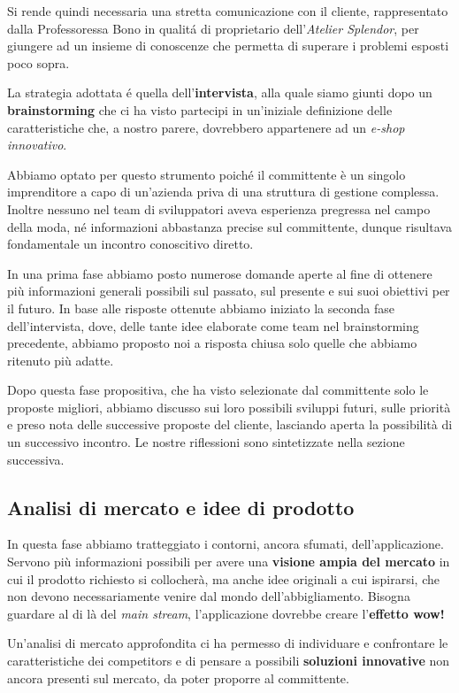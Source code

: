 \documentclass[12pt]{article}
\begin{document}
Si rende quindi necessaria una stretta comunicazione con il cliente, rappresentato dalla Professoressa Bono in qualit\'a di proprietario dell'{\em Atelier Splendor}, per giungere ad un insieme di conoscenze che permetta di superare i problemi esposti poco sopra.

La strategia adottata \'e quella dell'\textbf{intervista}, alla quale siamo giunti dopo un \textbf{brainstorming} che ci ha visto partecipi in un'iniziale definizione delle caratteristiche che, a nostro parere, dovrebbero appartenere ad un \textit{e-shop innovativo}.

Abbiamo optato per questo strumento poiché il committente è un singolo imprenditore a capo di un'azienda priva di una struttura di gestione complessa.
Inoltre nessuno nel team di sviluppatori aveva esperienza pregressa nel campo della moda, né informazioni abbastanza precise sul committente, dunque risultava fondamentale un incontro conoscitivo diretto.

In una prima fase abbiamo posto numerose domande aperte al fine di ottenere più informazioni generali possibili sul passato, sul presente e sui suoi obiettivi per il futuro.
In base alle risposte ottenute abbiamo iniziato la seconda fase dell'intervista, dove, delle tante idee elaborate come team nel brainstorming precedente, abbiamo proposto noi a risposta chiusa solo quelle che abbiamo ritenuto più adatte.

Dopo questa fase propositiva, che ha visto selezionate dal committente solo le proposte migliori, abbiamo discusso sui loro possibili sviluppi futuri, sulle priorità e preso nota delle successive proposte del cliente, lasciando aperta la possibilità di un successivo incontro.
Le nostre riflessioni sono sintetizzate nella sezione successiva. 


\subsection{Analisi di mercato e idee di prodotto} 

In questa fase abbiamo tratteggiato i contorni, ancora sfumati, dell'applicazione. Servono più informazioni possibili per avere una \textbf{visione ampia del mercato} in cui il prodotto richiesto si collocherà, ma anche idee originali a cui ispirarsi, che non devono necessariamente venire dal mondo dell'abbigliamento. Bisogna guardare al di là del {\em main stream}, l'applicazione dovrebbe creare l'\textbf{effetto wow!}

Un'analisi di mercato approfondita ci ha permesso di individuare e confrontare le caratteristiche dei competitors e di pensare a possibili \textbf{soluzioni innovative} non ancora presenti sul mercato, da poter proporre al committente.
\end{document}
